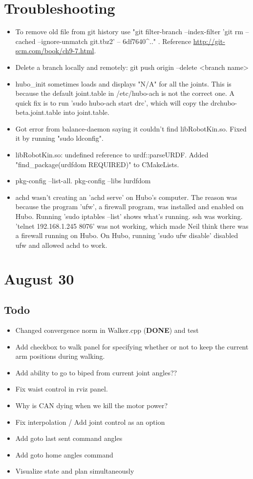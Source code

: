 \documentclass[letterpaper, 10 pt]{report}
\begin{document}
\section*{Troubleshooting}
\begin{itemize}
\item To remove old file from git history use "git filter-branch --index-filter 'git rm --cached --ignore-unmatch git.tbz2' -- 6df7640\string^.." . Reference \url{http://git-scm.com/book/ch9-7.html}.
\item Delete a branch locally and remotely: git push origin --delete <branch name>
\item hubo\_init sometimes loads and displays "N/A" for all the joints. This is because the default joint.table in /etc/hubo-ach is not the correct one. A quick fix is to run 'sudo hubo-ach start drc', which will copy the drchubo-beta.joint.table into joint.table.
\item Got error from balance-daemon saying it couldn't find libRobotKin.so. Fixed it by running "sudo ldconfig".
\item libRobotKin.so: undefined reference to urdf::parseURDF. Added "find\_package(urdfdom REQUIRED)" to CMakeLists.
\item pkg-config --list-all. pkg-config --libs lurdfdom
\item achd wasn't creating an 'achd serve' on Hubo's computer. The reason was because the program 'ufw', a firewall program, was installed and enabled on Hubo. Running 'sudo iptables --list' shows what's running. ssh was working. 'telnet 192.168.1.245 8076' was not working, which made Neil think there was a firewall running on Hubo. On Hubo, running 'sudo ufw disable' disabled ufw and allowed achd to work.
\end{itemize}

\section*{August 30}
\subsection*{Todo}
\begin{itemize}
  \item Changed convergence norm in Walker.cpp (\textbf{DONE}) and test
  \item Add checkbox to walk panel for specifying whether or not to keep the current arm positions during walking.
  \item Add ability to go to biped from current joint angles??
  \item Fix waist control in rviz panel.
  \item Why is CAN dying when we kill the motor power?
  \item Fix interpolation / Add joint control as an option
  \item Add goto last sent command angles
  \item Add goto home angles command
  \item Visualize state and plan simultaneously
\end{itemize}
\end{document}
